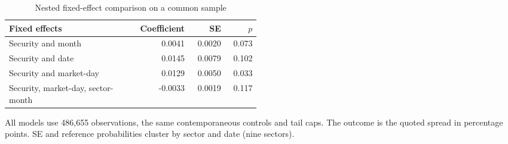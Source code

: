 \begin{table}[htbp]
\centering
\caption{Nested fixed-effect comparison on a common sample}
\label{tab:fe}
\begin{minipage}{\linewidth}
\small
\setlength{\tabcolsep}{4pt}
\begingroup\centering
\begin{tabular}{p{0.49\linewidth}rrr}
\toprule
Fixed effects & Coefficient & SE & $p$ \\
\midrule
Security and month & 0.0041 & 0.0020 & 0.073 \\
Security and date & 0.0145 & 0.0079 & 0.102 \\
Security and market-day & 0.0129 & 0.0050 & 0.033 \\
Security, market-day, sector-month & -0.0033 & 0.0019 & 0.117 \\
\bottomrule
\end{tabular}\par\endgroup
\par\vspace{0.5em}\footnotesize All models use 486,655 observations, the same contemporaneous controls and tail caps. The outcome is the quoted spread in percentage points. SE and reference probabilities cluster by sector and date (nine sectors).
\end{minipage}
\end{table}
